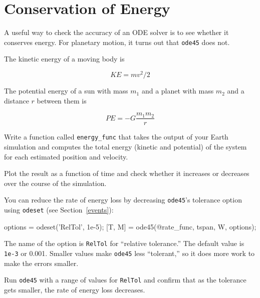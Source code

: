 \documentclass[main.tex]{subfiles}
\begin{document}
\section{Conservation of Energy}

A useful way to check the accuracy of an ODE solver is to see whether it conserves energy.  For planetary motion, it turns out that {\tt ode45} does not.


The kinetic energy of a moving body is

\begin{equation*}
KE = m v^2 / 2
\end{equation*}

The potential energy of a sun with mass $m_1$ and a
planet with mass $m_2$ and a distance $r$ between them is

\begin{equation}
PE = -G \frac{m_1 m_2}{r}
\end{equation}

Write a function called {\tt energy\_func} that takes the output of
your Earth simulation and computes the total
energy (kinetic and potential) of the system for each estimated
position and velocity.

Plot the result as a function of time and
check whether it increases or  decreases over the course of the simulation.


You can reduce the rate of energy loss by decreasing {\tt ode45}'s
tolerance option using {\tt odeset} (see Section~\ref{events}):

\begin{code}
options = odeset('RelTol', 1e-5);
[T, M] = ode45(@rate_func, tspan, W, options);
\end{code}

The name of the option is {\tt RelTol} for ``relative tolerance.''
The default value is {\tt 1e-3} or 0.001.  Smaller values
make {\tt ode45} less ``tolerant,'' so it does more work to
make the errors smaller.


Run {\tt ode45} with a range of values for {\tt RelTol} and confirm
that as the tolerance gets smaller, the rate of energy loss
decreases.

\end{document}
